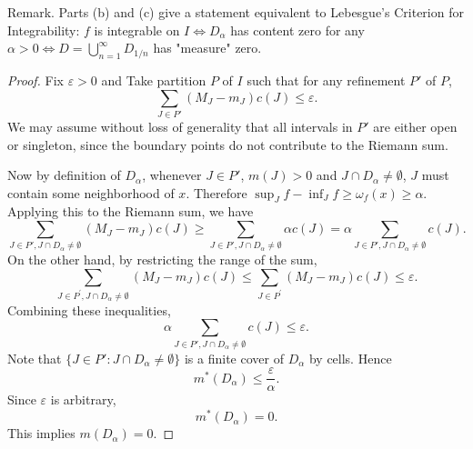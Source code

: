 Remark. Parts (b) and (c) give a statement equivalent to Lebesgue's Criterion for Integrability: $f$ is integrable on $I \Longleftrightarrow D_\alpha$ has content zero for any $\alpha>0 \Longleftrightarrow D=\bigcup_{n=1}^{\infty} D_{1 / n}$ has "measure" zero.
\begin{proof}
	Fix $\varepsilon>0$ and Take partition $P$ of $I$ such that for any refinement $P'$ of $P$,
	\[
		\sum_{J \in P'} (M_J - m_J) c(J) \le \varepsilon
	.\] 
	We may assume without loss of generality that all intervals in $P'$ are either open or singleton, since the boundary points do not contribute to the Riemann sum.

	Now by definition of $D_\alpha$, whenever $J \in P'$, $m(J) > 0$ and $J \cap D_\alpha \neq  \emptyset $, $J$ must contain some neighborhood of $x$. Therefore  $\sup_J f - \inf_J f \ge \omega_f(x) \ge \alpha$. Applying this to the Riemann sum, we have
	\[
		\sum_{J \in P', J \cap D_\alpha \neq \emptyset } (M_J - m_J) c(J) \ge 
		\sum_{J \in P', J \cap D_\alpha \neq \emptyset } \alpha c(J) = \alpha \sum_{J \in P', J \cap D_\alpha \neq \emptyset } c(J)
	.\] 
	On the other hand, by restricting the range of the sum,
	\[
	\sum_{J \in P^{\prime}, J \cap D_\alpha \neq \emptyset }\left(M_J-m_J\right) c(J) \le 
	\sum_{J \in P^{\prime}}\left(M_J-m_J\right) c(J) \le \varepsilon
	.\] 
	Combining these inequalities,
	\[
		 \alpha \sum_{J \in P', J \cap D_\alpha \neq \emptyset } c(J) \le \varepsilon
	.\] 
	Note that $\{J \in P' : J \cap D_\alpha \neq \emptyset \} $ is a finite cover of $D_\alpha$ by cells. Hence
	\[
		m^*(D_\alpha)\le \frac{\varepsilon}{\alpha}
	.\] 
	Since $\varepsilon$ is arbitrary,
	\[
		m^*(D_\alpha) = 0
	.\] 
	This implies $m(D_\alpha) = 0$.
\end{proof}


